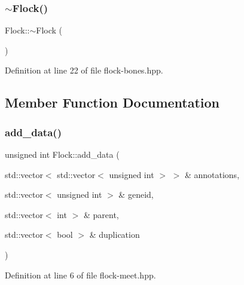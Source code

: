 \mbox{\label{class_flock_ab5ed0567a8721dd114763267f9fa3bdf}} 
\subsubsection{\texorpdfstring{$\sim$\+Flock()}{~Flock()}}
{\footnotesize\ttfamily Flock\+::$\sim$\+Flock (\begin{DoxyParamCaption}{ }\end{DoxyParamCaption})\hspace{0.3cm}{\ttfamily [inline]}}



Definition at line 22 of file flock-\/bones.\+hpp.



\subsection{Member Function Documentation}
\mbox{\label{class_flock_a17f2726d36ca5727b14c71d1e1dbabe9}} 
\subsubsection{\texorpdfstring{add\+\_\+data()}{add\_data()}}
{\footnotesize\ttfamily unsigned int Flock\+::add\+\_\+data (\begin{DoxyParamCaption}\item[{std\+::vector$<$ std\+::vector$<$ unsigned int $>$ $>$ \&}]{annotations,  }\item[{std\+::vector$<$ unsigned int $>$ \&}]{geneid,  }\item[{std\+::vector$<$ int $>$ \&}]{parent,  }\item[{std\+::vector$<$ bool $>$ \&}]{duplication }\end{DoxyParamCaption})\hspace{0.3cm}{\ttfamily [inline]}}



Definition at line 6 of file flock-\/meet.\+hpp.

\mbox{\label{class_flock_a1e7aec0dc05f41da6f0caa80a202daa0}} 

